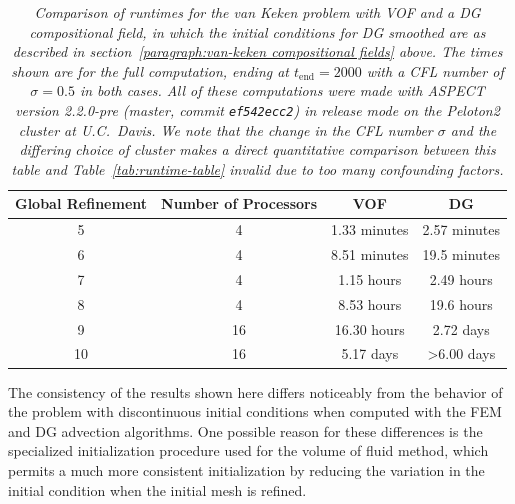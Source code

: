 \begin{table}
  \centering
   \begin{tabular}{|c|c|c|c|}
     \hline
      Global Refinement & Number of Processors & VOF & DG \\
      \hline
\phantom{1}5 & \phantom{1}4 &\phantom{6}1.33 minutes\phantom{hours} &\phantom{1}2.57 minutes  \\
\phantom{1}6 & \phantom{1}4 &\phantom{1}8.51 minutes\phantom{hours} & 19.5\phantom{7} minutes \\
\phantom{1}7 & \phantom{1}4 &\phantom{1}1.15 hours\phantom{minutes} & \phantom{1}2.49 hours\phantom{tes} \\
\phantom{1}8 & \phantom{1}4 &\phantom{1}8.53 hours\phantom{minutes} & 19.6 hours\phantom{tes} \\
\phantom{1}9 & 16           &         16.30 hours\phantom{minutes}  & \phantom{1}2.72 days\phantom{tes} \\
          10 & 16           & \phantom{1}5.17 days\phantom{minutess}&>6.00 days\phantom{tess} \\
            \hline
        \end{tabular}
        \caption{\it Comparison of runtimes for the van Keken problem with VOF
            and a DG compositional field, in which the initial conditions for
            DG smoothed are as described in section~\ref{paragraph:van-keken
            compositional fields} above.  The times shown are for the full
            computation, ending at $t_\text{end} = 2000$ with a CFL number of
            $\sigma=0.5$ in both cases. 
            All of these computations were made with ASPECT version 2.2.0-pre
            (master, commit \texttt{ef542ecc2}) in release mode on the Peloton2 cluster at
            U.C.~Davis.
            We note that the change in the CFL number $\sigma$ and the
            differing choice of cluster makes a direct quantitative comparison
            between this table and Table~\ref{tab:runtime-table} invalid due to
            too many confounding factors.
        }
        \label{tab:vof-runtime-comparison-table}
\end{table}

The consistency of the results shown here differs noticeably from the behavior of the  
problem with discontinuous initial conditions when computed with the FEM and DG advection 
algorithms.
One possible reason for these differences is the specialized initialization procedure used for 
the volume of fluid method, which permits a much more consistent initialization by 
reducing the variation in the initial condition when the initial mesh is refined.

